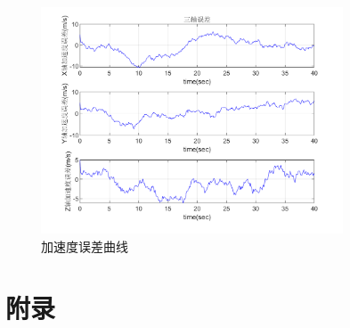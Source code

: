 \documentclass[12pt]{article}
\numberwithin{equation}{section} %
\begin{document}
\begin{figure}  %
    \centering
    \includegraphics[width=0.8\textwidth]{Fig/加速度误差曲线.png} %
    \caption{加速度误差曲线}
    \label{fig:加速度误差曲线} %
\end{figure}

\newpage

\section{附录}

\end{document}
